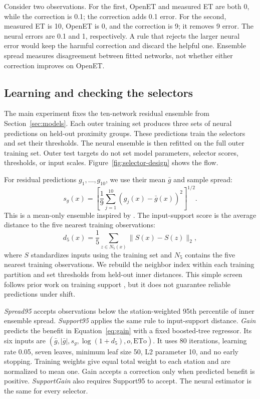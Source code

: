 \documentclass[10pt,letterpaper]{article}
\begin{document}
Consider two observations.
For the first, OpenET and measured ET are both 0, while the correction is 0.1; the correction adds 0.1 error.
For the second, measured ET is 10, OpenET is 0, and the correction is 9; it removes 9 error.
The neural errors are 0.1 and 1, respectively.
A rule that rejects the larger neural error would keep the harmful correction and discard the helpful one.
Ensemble spread measures disagreement between fitted networks, not whether either correction improves on OpenET.

\subsection{Learning and checking the selectors}
The main experiment fixes the ten-network residual ensemble from Section~\ref{sec:models}.
Each outer training set produces three sets of neural predictions on held-out proximity groups.
These predictions train the selectors and set their thresholds.
The neural ensemble is then refitted on the full outer training set.
Outer test targets do not set model parameters, selector scores, thresholds, or input scales.
Figure~\ref{fig:selector-design} shows the flow.

For residual predictions $g_1,\ldots,g_{10}$, we use their mean $\bar g$ and sample spread:
\begin{equation}
 s_g(x)=\left[\frac{1}{9}\sum_{j=1}^{10}(g_j(x)-\bar g(x))^2\right]^{1/2}.
\end{equation}
This is a mean-only ensemble inspired by \citet{laksh2017}.
The input-support score is the average distance to the five nearest training observations:
\begin{equation}
 d_5(x)=\frac{1}{5}\sum_{z\in N_5(x)}\|S(x)-S(z)\|_2,
\end{equation}
where $S$ standardizes inputs using the training set and $N_5$ contains the five nearest training observations.
We rebuild the neighbor index within each training partition and set thresholds from held-out inner distances.
This simple screen follows prior work on training support \citep{meyer2021}, but it does not guarantee reliable predictions under shift.

\emph{Spread95} accepts observations below the station-weighted 95th percentile of inner ensemble spread.
\emph{Support95} applies the same rule to input-support distance.
\emph{Gain} predicts the benefit in Equation~\ref{eq:gain} with a fixed boosted-tree regressor.
Its six inputs are $(\bar g,|\bar g|,s_g,\log(1+d_5),o,\mathrm{ETo})$.
It uses 80 iterations, learning rate 0.05, seven leaves, minimum leaf size 50, L2 parameter 10, and no early stopping.
Training weights give equal total weight to each station and are normalized to mean one.
Gain accepts a correction only when predicted benefit is positive.
\emph{SupportGain} also requires Support95 to accept.
The neural estimator is the same for every selector.
\end{document}
